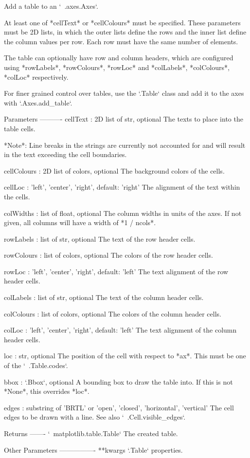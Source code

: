 \begin{DoxyVerb}Add a table to an `~.axes.Axes`.

At least one of *cellText* or *cellColours* must be specified. These
parameters must be 2D lists, in which the outer lists define the rows and
the inner list define the column values per row. Each row must have the
same number of elements.

The table can optionally have row and column headers, which are configured
using *rowLabels*, *rowColours*, *rowLoc* and *colLabels*, *colColours*,
*colLoc* respectively.

For finer grained control over tables, use the `.Table` class and add it to
the axes with `.Axes.add_table`.

Parameters
----------
cellText : 2D list of str, optional
    The texts to place into the table cells.

    *Note*: Line breaks in the strings are currently not accounted for and
    will result in the text exceeding the cell boundaries.

cellColours : 2D list of colors, optional
    The background colors of the cells.

cellLoc : {'left', 'center', 'right'}, default: 'right'
    The alignment of the text within the cells.

colWidths : list of float, optional
    The column widths in units of the axes. If not given, all columns will
    have a width of *1 / ncols*.

rowLabels : list of str, optional
    The text of the row header cells.

rowColours : list of colors, optional
    The colors of the row header cells.

rowLoc : {'left', 'center', 'right'}, default: 'left'
    The text alignment of the row header cells.

colLabels : list of str, optional
    The text of the column header cells.

colColours : list of colors, optional
    The colors of the column header cells.

colLoc : {'left', 'center', 'right'}, default: 'left'
    The text alignment of the column header cells.

loc : str, optional
    The position of the cell with respect to *ax*. This must be one of
    the `~.Table.codes`.

bbox : `.Bbox`, optional
    A bounding box to draw the table into. If this is not *None*, this
    overrides *loc*.

edges : substring of 'BRTL' or {'open', 'closed', 'horizontal', 'vertical'}
    The cell edges to be drawn with a line. See also
    `~.Cell.visible_edges`.

Returns
-------
`~matplotlib.table.Table`
    The created table.

Other Parameters
----------------
**kwargs
    `.Table` properties.

\end{DoxyVerb}
 

